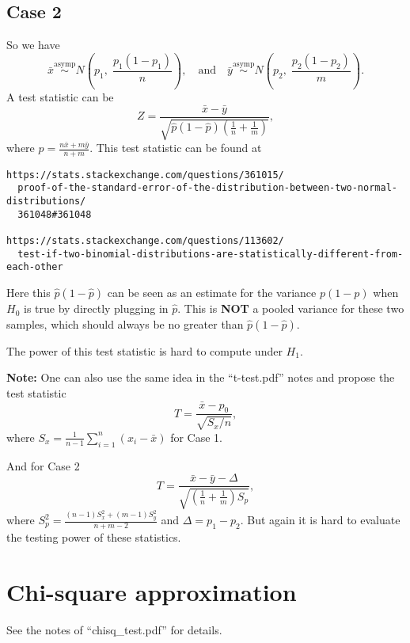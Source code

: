 \documentclass[a4paper,12pt]{article}
\begin{document}
\subsection{Case 2}
\label{sec:case-2}

So we have
\[
  \bar{x} \overset{\mathrm{asymp}}{\sim} N\left(p_1,\;\frac{p_1\left(1 - p_1\right)}{n}\right)
  ,\quad\text{and}\quad
  \bar{y} \overset{\mathrm{asymp}}{\sim} N\left(p_2,\;\frac{p_2\left(1 - p_2\right)}{m}\right)
  .
\]
A test statistic can be
\[
  Z = \frac{\bar{x} - \bar{y}}{
    \sqrt{
      \hat{p}\left(1 - \hat{p}\right)
      \left(\frac{1}{n} + \frac{1}{m}\right)
    }
  }
  ,
\]
where $\hat{p} = \frac{n\bar{x} + m\bar{y}}{n + m}$. This test statistic can be found at
\begin{verbatim}
https://stats.stackexchange.com/questions/361015/
  proof-of-the-standard-error-of-the-distribution-between-two-normal-distributions/
  361048#361048

https://stats.stackexchange.com/questions/113602/
  test-if-two-binomial-distributions-are-statistically-different-from-each-other
\end{verbatim}
Here this $\hat{p}\left(1 - \hat{p}\right)$ can be seen as an estimate for the variance $p\left(1 - p\right)$ when $H_0$ is true by directly plugging in $\hat{p}$. This is \textbf{NOT} a pooled variance for these two samples, which should always be no greater than $\hat{p}\left(1 - \hat{p}\right)$.
\par
The power of this test statistic is hard to compute under $H_1$.
\par
\textbf{Note: } One can also use the same idea in the ``t-test.pdf'' notes and propose the test statistic
\[
  T = \frac{\bar{x} - p_0}{\sqrt{S_x / n}}
  ,
\]
where $S_x = \frac{1}{n - 1}\sum\limits_{i = 1}^n\left(x_i - \bar{x}\right)$ for Case 1.
\par
And for Case 2
\[
  T = \frac{\bar{x} - \bar{y} - \Delta}{\sqrt{
      \left(\frac{1}{n} + \frac{1}{m}\right)S_p
    }}
  ,
\]
where $S_p^2 = \frac{\left(n - 1\right)S_x^2 + \left(m - 1\right)S_y^2}{n + m - 2}$ and $\Delta = p_1 - p_2$. But again it is hard to evaluate the testing power of these statistics.


\section{Chi-square approximation}
\label{sec:chi-square-appr}

See the notes of ``chisq\_test.pdf'' for details.
\end{document}
